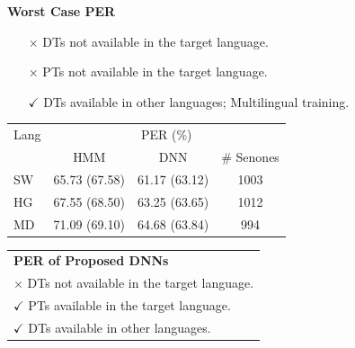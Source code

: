 \documentclass[landscape,paperwidth=58in,paperheight=40in,fontscale=0.285]{baposter} %
\newcommand{\compresslist}{ %
\setlength{\itemsep}{1pt}
\setlength{\parskip}{0pt}
\setlength{\parsep}{0pt}
}
\begin{document}
\begin{poster}
{\begin{multicols}{2}
\vfill
\columnbreak
\textbf{Worst Case PER}\vspace{-2mm}
\begin{itemize}\compresslist
\item [{$\times$}] DTs not available in the target language.
\item [{$\times$}] PTs not available in the target language.
\item [{$\checkmark$}] DTs available in other languages; Multilingual training.
\end{itemize}

\begin{center}
\begin{tabular}{l|c c c}
   \hline
Lang  & \multicolumn{3}{c}{PER (\%)} \\
          &  HMM & DNN & \# Senones   \\ \hline
SW      &65.73 (67.58)   &61.17 (63.12) & 1003 \\
HG      &67.55 (68.50)   &63.25 (63.65) &  1012 \\
MD     &71.09 (69.10)   &64.68 (63.84) & 994  \\ \hline
\end{tabular}
\end{center}
\end{multicols}


\begin{center}
 \begin{tabular}{@{}l@{}}
    \\ \textbf{PER of Proposed DNNs}\\
    {$\times$}\hspace{2mm} DTs not available in the target language. \\
    {$\checkmark$}\hspace{2mm} PTs available in the target language. \\
    {$\checkmark$}\hspace{2mm} DTs available in other languages.
 \end{tabular}
\end{center}

}
\end{poster}
\end{document}
